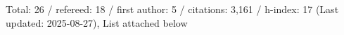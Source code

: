 Total: 26 / refereed: 18 / first author: 5 / citations: 3,161 / h-index: 17 (Last updated: 2025-08-27), List attached below